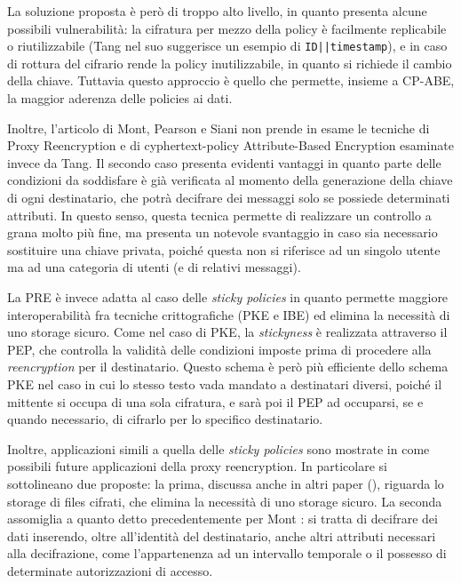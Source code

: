 La soluzione proposta \`e per\`o di troppo alto livello, in quanto presenta alcune possibili vulnerabilit\`a: la cifratura per mezzo della policy \`e facilmente replicabile o riutilizzabile (Tang nel suo \cite{tang2008using} suggerisce un esempio di \texttt{ID||timestamp}), e in caso di rottura del cifrario rende la policy inutilizzabile, in quanto si richiede il cambio della chiave. Tuttavia questo approccio \`e quello che permette, insieme a CP-ABE, la maggior aderenza delle policies ai dati.

Inoltre, l’articolo di Mont, Pearson e Siani non prende in esame le tecniche di Proxy Reencryption \cite{green2007identity} e di cyphertext-policy Attribute-Based Encryption \cite{bethencourt2007ciphertext} esaminate invece da Tang. Il secondo caso presenta evidenti vantaggi in quanto parte delle condizioni da soddisfare \`e gi\`a verificata al momento della generazione della chiave di ogni destinatario, che potr\`a decifrare dei messaggi solo se possiede determinati attributi. In questo senso, questa tecnica permette di realizzare un controllo a grana molto pi\`u fine, ma presenta un notevole svantaggio in caso sia necessario sostituire una chiave privata, poich\'e questa non si riferisce ad un singolo utente ma ad una categoria di utenti (e di relativi messaggi).

La PRE \`e invece adatta al caso delle \textit{sticky policies} in quanto permette maggiore interoperabilit\`a fra tecniche crittografiche (PKE e IBE) ed elimina la necessit\`a di uno storage sicuro. Come nel caso di PKE, la \textit{stickyness} \`e realizzata attraverso il PEP, che controlla la validit\`a delle condizioni imposte prima di procedere alla \textit{reencryption} per il destinatario. Questo schema \`e per\`o pi\`u efficiente dello schema PKE nel caso in cui lo stesso testo vada mandato a destinatari diversi, poich\'e il mittente si occupa di una sola cifratura, e sar\`a poi il PEP ad occuparsi, se e quando necessario, di cifrarlo per lo specifico destinatario.

Inoltre, applicazioni simili a quella delle \textit{sticky policies} sono mostrate in \cite{green2007identity} come possibili future applicazioni della proxy reencryption. In particolare si sottolineano due proposte: la prima, discussa anche in altri paper (), riguarda lo storage di files cifrati, che elimina la necessit\`a di uno storage sicuro. La seconda assomiglia a quanto detto precedentemente per Mont \cite{mont2003towards}: si tratta di decifrare dei dati inserendo, oltre all’identit\`a del destinatario, anche altri attributi necessari alla decifrazione, come l’appartenenza ad un intervallo temporale o il possesso di determinate autorizzazioni di accesso.
